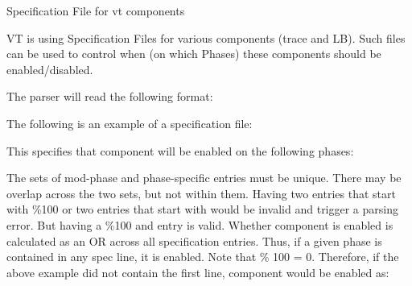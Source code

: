 Specification File for vt components

VT is using Specification Files for various components (trace and LB). Such files can be used to control when (on which Phases) these components should be enabled/disabled.

The parser will read the following format\+:


\begin{DoxyCode}{0}
\end{DoxyCode}


The following is an example of a specification file\+:


\begin{DoxyCode}{0}
\end{DoxyCode}


This specifies that component will be enabled on the following phases\+:


\begin{DoxyCode}{0}
\DoxyCodeLine{\{}
\DoxyCodeLine{\}}
\end{DoxyCode}


The sets of mod-\/phase and phase-\/specific entries must be unique. There may be overlap across the two sets, but not within them. Having two entries that start with {\ttfamily \%100} or two entries that start with {} would be invalid and trigger a parsing error. But having a {\ttfamily \%100} and {} entry is valid. Whether component is enabled is calculated as an OR across all specification entries. Thus, if a given phase is contained in any spec line, it is enabled. Note that { \% 100 = 0}. Therefore, if the above example did not contain the first line, component would be enabled as\+:


\begin{DoxyCode}{0}
\DoxyCodeLine{\{}
\DoxyCodeLine{  [97,103],}
\DoxyCodeLine{  [195,205],}
\DoxyCodeLine{\}}
\end{DoxyCode}
 